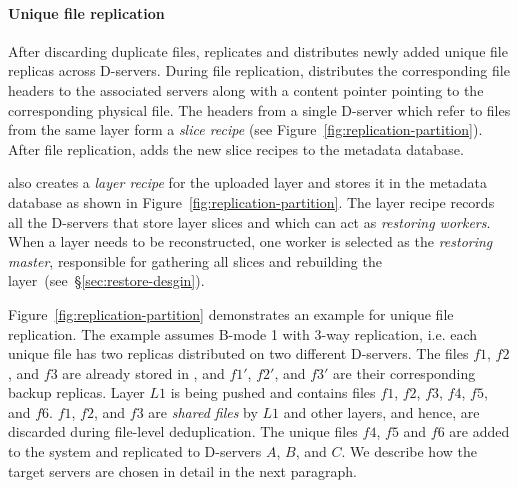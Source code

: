 \paragraph{Unique file replication}


After discarding duplicate files,
\sysname replicates and distributes newly added unique file replicas across D-servers.
%
During file replication, \sysname distributes the corresponding
file headers to the associated servers 
along with a content pointer pointing to the corresponding physical file.
The headers from a single D-server which refer to files from the same layer
form a \emph{slice recipe} (see Figure~\ref{fig:replication-partition}). 
After file replication, \sysname adds the new slice recipes to the metadata database.

\sysname also creates a \emph{layer recipe} for the uploaded layer and stores it in the metadata database
as shown in Figure~\ref{fig:replication-partition}.
The layer recipe records all the D-servers that store layer slices and which can act
as \emph{restoring workers}. When a layer needs to be reconstructed,
one worker is selected as the \emph{restoring master}, responsible 
for gathering all slices and rebuilding the layer~(see~\S\ref{sec:restore-desgin}).

Figure~\ref{fig:replication-partition} demonstrates an example for unique file replication.
The example assumes B-mode 1 with 3-way replication, i.e. each unique file has two replicas distributed
on two different D-servers.
The files $f1$, $f2$, and $f3$ are already stored in \sysname,
and $f1'$, $f2'$, and $f3'$ are their corresponding backup replicas.
Layer $L1$ is being pushed and contains files $f1$, $f2$, $f3$, $f4$, $f5$, and $f6$. 
$f1$, $f2$, and $f3$ are \emph{shared files} by $L1$ and other layers, and hence,
are discarded during file-level deduplication.
The unique files $f4$, $f5$ and $f6$ are added to the system and
replicated to D-servers $A$, $B$, and $C$. We describe how the target servers are chosen in detail
in the next paragraph.

